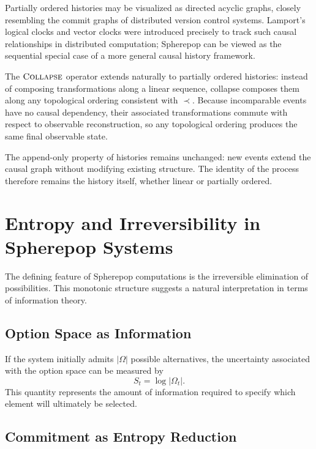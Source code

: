 \documentclass[12pt]{article}
\newcommand{\Collapse}{\operatorname{\textsc{Collapse}}}
\newcommand{\Option}{\Omega}
\begin{document}
Partially ordered histories may be visualized as directed acyclic graphs, closely resembling the commit graphs of distributed version control systems. Lamport's logical clocks and vector clocks were introduced precisely to track such causal relationships in distributed computation; Spherepop can be viewed as the sequential special case of a more general causal history framework.

The $\Collapse$ operator extends naturally to partially ordered histories: instead of composing transformations along a linear sequence, collapse composes them along any topological ordering consistent with $\prec$. Because incomparable events have no causal dependency, their associated transformations commute with respect to observable reconstruction, so any topological ordering produces the same final observable state.

The append-only property of histories remains unchanged: new events extend the causal graph without modifying existing structure. The identity of the process therefore remains the history itself, whether linear or partially ordered.

\section{Entropy and Irreversibility in Spherepop Systems}
\label{sec:entropy}

The defining feature of Spherepop computations is the irreversible elimination of possibilities. This monotonic structure suggests a natural interpretation in terms of information theory.

\subsection{Option Space as Information}

If the system initially admits $|\Option|$ possible alternatives, the uncertainty associated with the option space can be measured by
\[
S_t = \log |\Option_t|.
\]
This quantity represents the amount of information required to specify which element will ultimately be selected.

\subsection{Commitment as Entropy Reduction}
\end{document}
